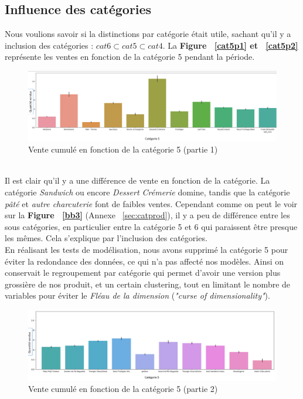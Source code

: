 \documentclass{article} %
\begin{document}
\subsection{Influence des catégories}
Nous voulions savoir si la distinctions par catégorie était utile, sachant qu'il y a inclusion des catégories : $cat6 \subset cat5 \subset cat4$. La \textbf{Figure ~\ref{cat5p1} et ~\ref{cat5p2} } représente les ventes en fonction de la catégorie 5 pendant la période.\\ 
\begin{figure}[!h]
	\centering
	\includegraphics[keepaspectratio = true,scale=0.65]{categorie5part1.png}
	\caption{Vente cumulé en fonction de la catégorie 5 (partie 1)}
	\label{fig:cat5p1}
\end{figure}
~\\
Il est clair qu'il y a une différence de vente en fonction de la catégorie. La catégorie \textit{Sandwich} ou encore \textit{Dessert Crémerie} domine, tandis que la catégorie \textit{pâté} et \textit{autre charcuterie} font de faibles ventes. Cependant comme  on peut le voir sur la \textbf{Figure ~\ref{bb3}} (Annexe ~\ref{sec:catprod}), il y a peu de différence entre les sous catégories, en particulier entre la catégorie 5 et 6 qui paraissent être presque les mêmes. Cela s'explique par l'inclusion des catégories.\\
En réalisant les tests de modélisation, nous avons supprimé la catégorie 5 pour éviter la redondance des données, ce qui n'a pas affecté nos modèles. Ainsi on conservait le regroupement par catégorie qui permet d'avoir une version plus grossière de nos produit, et un certain clustering, tout en limitant le nombre de variables pour éviter le \textit{Fléau de la dimension} (\textit{"curse of dimensionality"}). 
\begin{figure}[!h]
	\centering
	\includegraphics[keepaspectratio = true,scale=0.65]{categorie5part2.png}
	\caption{Vente cumulé en fonction de la catégorie 5 (partie 2)}
	\label{fig:cat5p2}
\end{figure}
\end{document}
